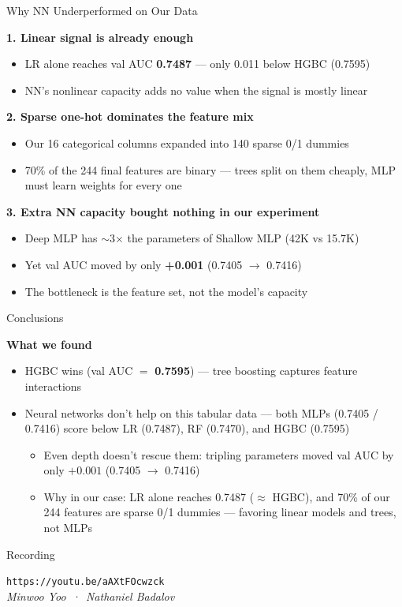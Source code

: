 \documentclass[aspectratio=169,11pt]{beamer}
\newcommand{\hi}[1]{{\color{accent}\textbf{#1}}}
\begin{document}
\begin{frame}{Why NN Underperformed on Our Data}

\scriptsize

\textbf{1. Linear signal is already enough}
\begin{itemize}
    \item LR alone reaches val AUC \textbf{0.7487} — only 0.011 below HGBC (0.7595)
    \item NN's nonlinear capacity adds no value when the signal is mostly linear
\end{itemize}

\textbf{2. Sparse one-hot dominates the feature mix}
\begin{itemize}
    \item Our 16 categorical columns expanded into 140 sparse 0/1 dummies
    \item 70\% of the 244 final features are binary — trees split on them cheaply, MLP must learn weights for every one
\end{itemize}

\textbf{3. Extra NN capacity bought nothing in our experiment}
\begin{itemize}
    \item Deep MLP has $\sim$3$\times$ the parameters of Shallow MLP (42K vs 15.7K)
    \item Yet val AUC moved by only \textbf{+0.001} (0.7405 $\to$ 0.7416)
    \item The bottleneck is the feature set, not the model's capacity
\end{itemize}

\end{frame}


\begin{frame}{Conclusions}

\footnotesize

\textbf{What we found}
\begin{itemize}
    \item HGBC wins (val AUC $=$ \hi{0.7595}) — tree boosting captures feature interactions
    \item Neural networks don't help on this tabular data — both MLPs (0.7405 / 0.7416) score below LR (0.7487), RF (0.7470), and HGBC (0.7595)
    \begin{itemize}
        \item Even depth doesn't rescue them: tripling parameters moved val AUC by only $+0.001$ (0.7405 $\to$ 0.7416)
        \item Why in our case: LR alone reaches 0.7487 ($\approx$ HGBC), and 70\% of our 244 features are sparse 0/1 dummies — favoring linear models and trees, not MLPs
    \end{itemize}
\end{itemize}

\end{frame}


\begin{frame}{Recording}
\vfill
\begin{center}
{\Large \texttt{https://youtu.be/aAXtFOcwzck}}\\[1.5em]
{\color{muted}\itshape Minwoo Yoo  \,·\,  Nathaniel Badalov}
\end{center}
\vfill
\end{frame}
\end{document}
